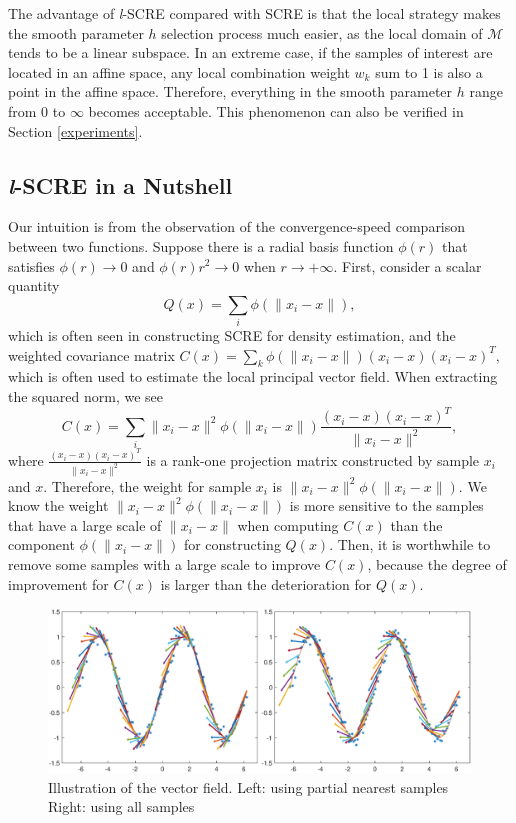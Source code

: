 \documentclass[aos,preprint]{imsart}
\theoremstyle{remark}
\begin{document}
The advantage of {\it l}-SCRE compared with SCRE is that the local strategy makes the smooth parameter $h$ selection process much easier, as the local domain of $\mathcal M$ tends to be a linear subspace. In an extreme case, if the samples of interest are located in an affine space, any local combination weight $w_k $ sum to 1 is also a point in the affine space. Therefore, everything in the smooth parameter $h$ range from $0$ to $\infty$ becomes acceptable. This phenomenon can also be verified in Section \ref{experiments}.


\subsection{{\it l}-SCRE in a Nutshell}
Our intuition is from the observation of the convergence-speed comparison between two functions. Suppose there is a radial basis function $\phi(r)$ that satisfies $\phi(r)\rightarrow 0$ and $\phi(r)r^2\rightarrow 0$ when $ r \rightarrow +\infty$. First, consider a scalar quantity 
\[
 Q(x) = \sum_i \phi(\|x_i-x\|),
\]
which is often seen in constructing SCRE for density estimation, and the weighted covariance matrix $C(x) = \sum_k \phi(\|x_i-x\|)(x_i-x)(x_i-x)^T$, which is often used to estimate the local principal vector field. When extracting the squared norm, we see
\[
  C(x) = \sum_i \|x_i-x\|^2\phi(\|x_i-x\|)\frac{(x_i-x)(x_i-x)^T}{\|x_i-x\|^2} ,
\]
where $\frac{(x_i-x)(x_i-x)^T}{\|x_i-x\|^2}$ is a rank-one projection matrix constructed by sample $x_i$ and $x$. Therefore, the weight for sample $x_i$ is $\|x_i-x\|^2\phi(\|x_i-x\|)$.
 We know the weight $\|x_i-x\|^2\phi(\|x_i-x\|)$ is more sensitive to the samples that have a large scale of $\|x_i-x\|$ when computing $C(x)$ than the component $\phi(\|x_i-x\|)$ for constructing $Q(x)$. Then, it is worthwhile to remove some samples with a large scale to improve $C(x)$, because the degree of improvement for $C(x)$ is larger than the deterioration for $Q(x)$. %
\begin{figure}[h] %
   \centering
   \includegraphics[width=\linewidth]{field_demo.eps} 
   \caption{Illustration of the vector field. Left: using partial nearest samples Right: using all samples}
   \label{fig:example}
\end{figure}
\end{document}
